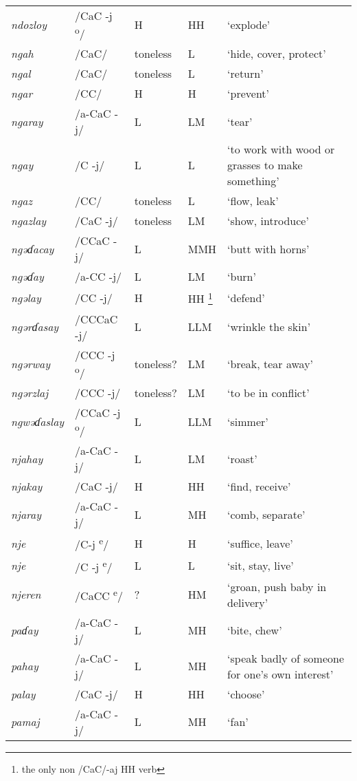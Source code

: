 \begin{small}
\begin{longtable}{lp{1.75cm}p{1.75cm}p{1.75cm}p{3cm}}
\textit{ndozloy} & /CaC -j\textsuperscript{ o}/ & H & HH & ‘explode’\\
\textit{ngah} & /CaC/ & toneless & L & ‘hide, cover, protect’\\
\textit{ngal} & /CaC/ & toneless & L & ‘return’\\
\textit{ngar} & /CC/ & H & H & ‘prevent’\\
\textit{ngaray} & /a-CaC -j/ & L & LM & ‘tear’\\
\textit{ngay} & /C -j/ & L & L & ‘to work with wood or grasses to make something’\\
\textit{ngaz} & /CC/ & toneless & L & ‘flow, leak’\\
\textit{ngazlay} & /CaC -j/ & toneless & LM & ‘show, introduce’\\
\textit{ngəɗacay} & /CCaC -j/ & L & MMH & ‘butt with horns’\\
\textit{ngəɗay} & /a-CC -j/ & L & LM & ‘burn’\\
\textit{ngəlay} & /CC -j/ & H & HH \footnote{the only non /CaC/-aj HH verb} & ‘defend’\\
\textit{ngərɗasay} & /CCCaC -j/ & L & LLM & ‘wrinkle the skin’\\
\textit{ngərway} & /CCC -j\textsuperscript{ o}/ & toneless? & LM & ‘break, tear away’\\
\textit{ngərzlaj} & /CCC -j/ & toneless? & LM & ‘to be in conflict’\\
\textit{ngwəɗaslay} & /CCaC -j\textsuperscript{ o}/ & L & LLM & ‘simmer’\\
\textit{njahay} & /a-CaC -j/ & L & LM & ‘roast’\\
\textit{njakay} & /CaC -j/ & H & HH & ‘find, receive’\\
\textit{njaray} & /a-CaC -j/ & L & MH & ‘comb, separate’\\
\textit{nje} & /C-j \textsuperscript{e}/ & H & H & ‘suffice, leave’\\
\textit{nje} & /C -j \textsuperscript{e}/ & L & L & ‘sit, stay, live’\\
\textit{njeren} & /CaCC \textsuperscript{e}/ & ? & HM & ‘groan, push baby in delivery’\\
\textit{paɗay} & /a-CaC -j/ & L & MH & ‘bite, chew’\\
\textit{pahay} & /a-CaC -j/ & L & MH & ‘speak badly of someone for one's own interest’\\
\textit{palay} & /CaC -j/ & H & HH & ‘choose’\\
\textit{pamaj} & /a-CaC -j/ & L & MH & ‘fan’\\

\end{longtable}
\end{small}
